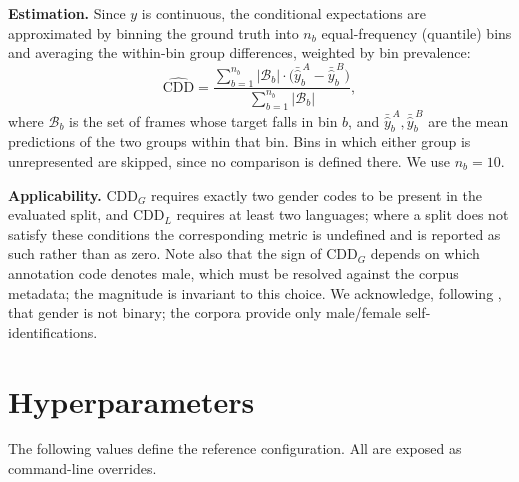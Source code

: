 \documentclass[11pt,a4paper]{article}
\begin{document}
	\textbf{Estimation.} Since $y$ is continuous, the conditional expectations are approximated by binning the ground truth into $n_b$ equal-frequency (quantile) bins and averaging the within-bin group differences, weighted by bin prevalence:
	$$
	\widehat{\text{CDD}} = \frac{\sum_{b=1}^{n_b} |\mathcal{B}_b| \cdot \bigl(\bar{\hat{y}}^{\,A}_b - \bar{\hat{y}}^{\,B}_b\bigr)}{\sum_{b=1}^{n_b} |\mathcal{B}_b|},
	$$
	where $\mathcal{B}_b$ is the set of frames whose target falls in bin $b$, and $\bar{\hat{y}}^{\,A}_b, \bar{\hat{y}}^{\,B}_b$ are the mean predictions of the two groups within that bin. Bins in which either group is unrepresented are skipped, since no comparison is defined there. We use $n_b = 10$.
	
	\textbf{Applicability.} $\text{CDD}_G$ requires exactly two gender codes to be present in the evaluated split, and $\text{CDD}_L$ requires at least two languages; where a split does not satisfy these conditions the corresponding metric is undefined and is reported as such rather than as zero. Note also that the sign of $\text{CDD}_G$ depends on which annotation code denotes male, which must be resolved against the corpus metadata; the magnitude is invariant to this choice. We acknowledge, following \cite{withanage25}, that gender is not binary; the corpora provide only male/female self-identifications.

	\section{Hyperparameters}
	
	The following values define the reference configuration. All are exposed as command-line overrides.
	
\end{document}
